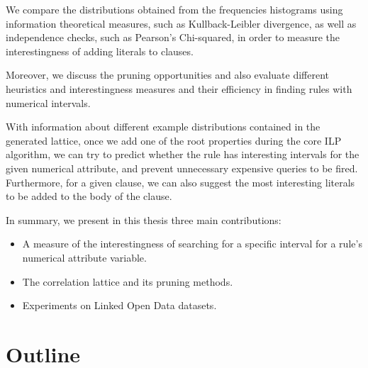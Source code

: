 We compare the distributions obtained from the frequencies histograms using information theoretical measures,
such as Kullback-Leibler divergence, as well as independence checks, such as Pearson's Chi-squared, in order to
measure the interestingness of adding literals to clauses.

Moreover, we discuss the pruning opportunities and also evaluate different heuristics and interestingness measures and
their efficiency in finding rules with numerical intervals. 

\begin{comment}
In a clause containing a numerical attribute in the body, we can obtain a support and confidence as well as support
value for each of the buckets. Therewith, we can search the most interesting intervals that satisfies the support and
confidence thresholds
\end{comment}

With information about different example distributions contained in the generated lattice, once we add one of the root
properties during the core ILP algorithm, we can try to predict whether the rule has interesting intervals for the
given numerical attribute, and prevent unnecessary expensive queries to be fired. Furthermore, for a given clause, we
can also suggest the most interesting literals to be added to the body of the clause.

In summary, we present in this thesis three main contributions:

\begin{itemize}
 \item A measure of the interestingness of searching for a specific interval for a rule's numerical attribute
variable.
 \item The correlation lattice and its pruning methods.
 \item Experiments on Linked Open Data datasets.
\end{itemize}


\section{Outline}

\begin{comment}
 The remainder of this thesis is structured as follows. In
Chapter~\ref{ch:technical_background}, we provide technical background on
MapReduce and BigTable. In Chapter~\ref{ch:related_work}, we present a
summary of previous work in the areas of duplicate and near-duplicate detection,
information retrieval on web archives, and MapReduce applications in graph
processing. Following that, we state our problem and describe solutions in
Chapter~\ref{ch:redundancy_control}. In Chapter~\ref{ch:mapreduce_impl}, we
describe an implementation of our solution using the MapReduce framework. In
Chapter~\ref{ch:experiments}, we present our experimental results. We conclude
this thesis and outline directions of future research in Chapter~\ref{ch:future_work}.
\end{comment}
